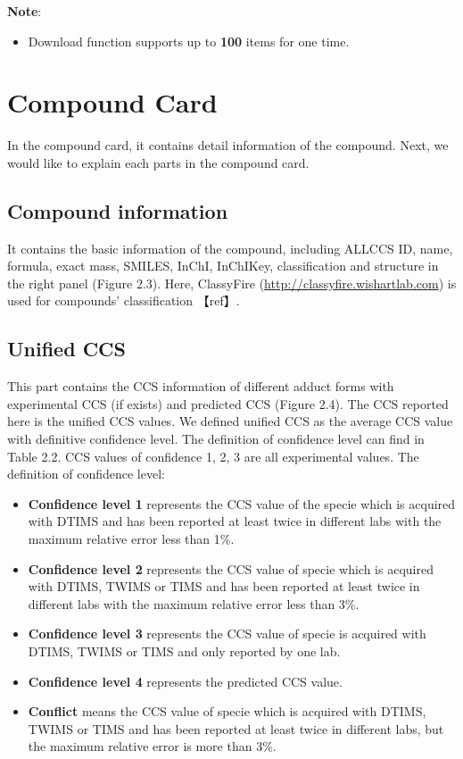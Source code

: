 \documentclass[12pt,]{book}
\providecommand{\tightlist}{%
  \setlength{\itemsep}{0pt}\setlength{\parskip}{0pt}}
\theoremstyle{definition}
\theoremstyle{definition}
\theoremstyle{definition}
\theoremstyle{remark}
\begin{document}
\textbf{Note}:

\begin{itemize}
\tightlist
\item
  Download function supports up to \textbf{100} items for one time.
\end{itemize}

\section{Compound Card}\label{compound-card}

In the compound card, it contains detail information of the compound.
Next, we would like to explain each parts in the compound card.

\subsection{Compound information}\label{compound-information}

It contains the basic information of the compound, including ALLCCS ID,
name, formula, exact mass, SMILES, InChI, InChIKey, classification and
structure in the right panel (Figure 2.3). Here, ClassyFire
(\url{http://classyfire.wishartlab.com}) is used for compounds'
classification 【ref】.

\subsection{Unified CCS}\label{unified-ccs}

This part contains the CCS information of different adduct forms with
experimental CCS (if exists) and predicted CCS (Figure 2.4). The CCS
reported here is the unified CCS values. We defined unified CCS as the
average CCS value with definitive confidence level. The definition of
confidence level can find in Table 2.2. CCS values of confidence 1, 2, 3
are all experimental values. The definition of confidence level:

\begin{itemize}
\tightlist
\item
  \textbf{Confidence level 1} represents the CCS value of the specie
  which is acquired with DTIMS and has been reported at least twice in
  different labs with the maximum relative error less than 1\%.
\item
  \textbf{Confidence level 2} represents the CCS value of specie which
  is acquired with DTIMS, TWIMS or TIMS and has been reported at least
  twice in different labs with the maximum relative error less than 3\%.
\item
  \textbf{Confidence level 3} represents the CCS value of specie is
  acquired with DTIMS, TWIMS or TIMS and only reported by one lab.
\item
  \textbf{Confidence level 4} represents the predicted CCS value.
\item
  \textbf{Conflict} means the CCS value of specie which is acquired with
  DTIMS, TWIMS or TIMS and has been reported at least twice in different
  labs, but the maximum relative error is more than 3\%.
\end{itemize}
\end{document}
